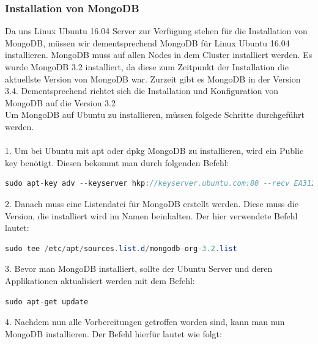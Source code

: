 \subsubsection{Installation von MongoDB}
Da uns Linux Ubuntu 16.04 Server zur Verf\"ugung stehen f\"ur die Installation von MongoDB, m\"ussen wir dementsprechend MongoDB f\"ur Linux Ubuntu 16.04 installieren. MongoDB muss auf allen Nodes in dem Cluster installiert werden. Es wurde MongoDB 3.2 installiert, da diese zum Zeitpunkt der Installation die aktuellste Version von MongoDB war. Zurzeit gibt es MongoDB in der Version 3.4. Dementsprechend richtet sich die Installation und Konfiguration von MongoDB auf die Version 3.2
\\
Um MongoDB auf Ubuntu zu installieren, m\"ussen folgede Schritte durchgef\"uhrt werden.
\\
\\
1.	Um bei Ubuntu mit apt oder dpkg MongoDB zu installieren, wird ein Public key ben\"otigt. Diesen bekommt man durch folgenden Befehl:
\\
\begin{lstlisting}[caption={Befehl, um den Public Key zu erhalten}, language=java,captionpos=t,numbers=none, numberstyle=\tiny,basicstyle=\scriptsize,breaklines=true]
sudo apt-key adv --keyserver hkp://keyserver.ubuntu.com:80 --recv EA312927
\end{lstlisting}

2.	Danach muss eine Listendatei f\"ur MongoDB erstellt werden. Diese muss die Version, die installiert wird im Namen beinhalten. Der hier verwendete Befehl lautet:

\begin{lstlisting}[caption={Erstellung der Liste f\"ur die Installation}, language=java,captionpos=t,numbers=none, numberstyle=\tiny,basicstyle=\scriptsize,breaklines=true]
sudo tee /etc/apt/sources.list.d/mongodb-org-3.2.list
\end{lstlisting}

3.	Bevor man MongoDB installiert, sollte der Ubuntu Server und deren Applikationen aktualisiert werden mit dem Befehl:

\begin{lstlisting}[caption={Aktuallisierung des Servers}, language=java,captionpos=t,numbers=none, numberstyle=\tiny,basicstyle=\scriptsize,breaklines=true]
sudo apt-get update
\end{lstlisting}

4.	Nachdem nun alle Vorbereitungen getroffen worden sind, kann man nun MongoDB installieren. Der Befehl hierf\"ur lautet wie folgt:


